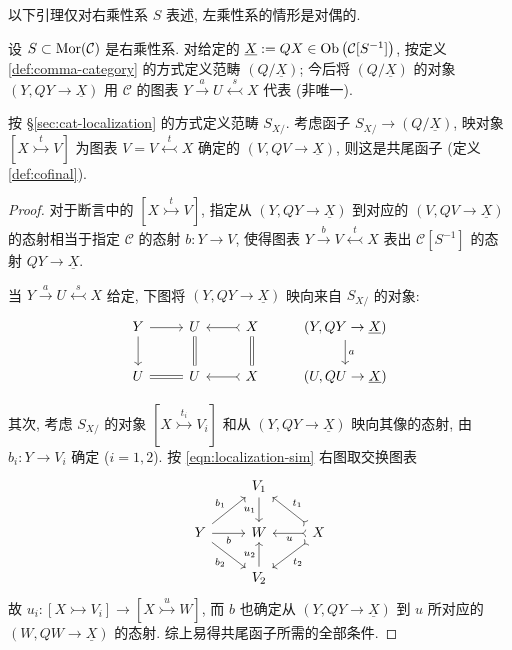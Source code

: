 以下引理仅对右乘性系 $S$ 表述, 左乘性系的情形是对偶的.

\begin{lemma}\label{prop:injective-localization-prep}
	设 $S \subset \operatorname{Mor}(\mathcal{C})$ 是右乘性系. 对给定的 $\underline{X} := QX \in \operatorname{Ob}\left(\mathcal{C}[S^{-1}]\right)$, 按定义 \ref{def:comma-category} 的方式定义范畴 $(Q/\underline{X})$; 今后将 $(Q/\underline{X})$ 的对象 $(Y, QY \to \underline{X})$ 用 $\mathcal{C}$ 的图表 $Y \xrightarrow{a} U \stackrel{s}{\leftarrowtail} X$ 代表 (非唯一).
	
	按 \S\ref{sec:cat-localization} 的方式定义范畴 $S_{X/}$. 考虑函子 $S_{X/} \to (Q/\underline{X})$, 映对象 $[X \stackrel{t}{\rightarrowtail} V]$ 为图表 $V = V \stackrel{t}{\leftarrowtail} X$ 确定的 $(V, QV \to \underline{X})$, 则这是共尾函子 (定义 \ref{def:cofinal}).
\end{lemma}
\begin{proof}
	对于断言中的 $[X \stackrel{t}{\rightarrowtail} V]$, 指定从 $(Y, QY \to \underline{X})$ 到对应的 $(V, QV \to \underline{X})$ 的态射相当于指定 $\mathcal{C}$ 的态射 $b: Y \to V$, 使得图表 $Y \xrightarrow{b} V \stackrel{t}{\leftarrowtail} X$ 表出 $\mathcal{C}[S^{-1}]$ 的态射 $QY \to \underline{X}$.
	
	当 $Y \xrightarrow{a} U \stackrel{s}{\leftarrowtail} X$ 给定, 下图将 $(Y, QY \to \underline{X})$ 映向来自 $S_{X/}$ 的对象:
	\begin{equation*}\begin{tikzcd}
		Y \arrow[r] \arrow[d] & U \arrow[equal, d] & X \arrow[rightarrowtail, l] \arrow[equal, d] & (Y, QY \to \underline{X}) \arrow[d, "a"] \\
		U \arrow[equal, r] & U & X \arrow[rightarrowtail, l] & (U, QU \to \underline{X})
	\end{tikzcd}\end{equation*}

	其次, 考虑 $S_{X/}$ 的对象 $[X \stackrel{t_i}{\rightarrowtail} V_i]$ 和从 $(Y, QY \to \underline{X})$ 映向其像的态射, 由 $b_i: Y \to V_i$ 确定 ($i=1, 2$). 按 \eqref{eqn:localization-sim} 右图取交换图表
	\[\begin{tikzcd}
		& V_1 \arrow[d, "{u_1}"'] & \\
		Y \arrow[r, "b"'] \arrow[ru, "{b_1}"] \arrow[rd, "{b_2}"'] & W & X \arrow[rightarrowtail, l, "u"] \arrow[rightarrowtail, lu, "{t_1}"'] \arrow[rightarrowtail, ld, "{t_2}"] \\
		& V_2 \arrow[u, "{u_2}"] &
	\end{tikzcd}\]
	故 $u_i: [X \rightarrowtail V_i] \to [X \stackrel{u}{\rightarrowtail} W]$, 而 $b$ 也确定从 $(Y, QY \to \underline{X})$ 到 $u$ 所对应的 $(W, QW \to \underline{X})$ 的态射. 综上易得共尾函子所需的全部条件.
\end{proof}

